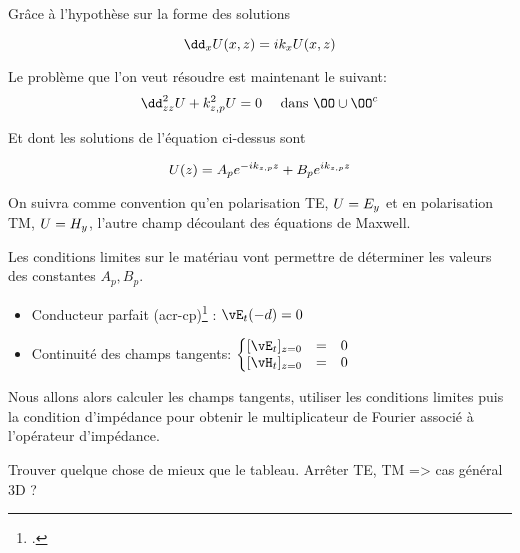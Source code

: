 


Grâce à l'hypothèse sur la forme des solutions

\[
\dd_{\x} U(\x,\z) = ik_\x U(\x,\z)
\]

Le problème que l'on veut résoudre est maintenant le suivant:
\begin{equation}
\dd_{\z\z}^2 U + k_{\z,p}^2 U = 0 \quad \text { dans \(\OO\cup\OO^c\)}
\end{equation}

Et dont les solutions de l'équation ci-dessus sont

\[
\hfill U(\z) = A_p e^{-ik_{\z,p} \z}  + B_p e^{ik_{\z,p} \z}
\]

On suivra comme convention qu'en polarisation TE, \( U = E_{y}\) et en polarisation TM, \( U = H_{y}\), l'autre champ découlant des équations de Maxwell.


Les conditions limites sur le matériau vont permettre de déterminer les valeurs des constantes \(A_p, B_p\).
\begin{itemize}
    \item 
    Conducteur parfait (\gls{acr-cp})\footcite[p.~217]{morse_methods_1953} : \(\vE_t(-d) = 0  \)
    \item 
    Continuité des champs tangents: \(
    \left\lbrace 
    \begin{matrix}
    [ \vE_t]_{\z=0} &=& 0 \\
    [ \vH_t]_{\z=0} &=& 0 
    \end{matrix}
    \right.\)
\end{itemize}

Nous allons alors calculer les champs tangents, utiliser les conditions limites puis la condition d'impédance pour obtenir le multiplicateur de Fourier associé à l'opérateur d'impédance.

\begin{TODO}
  Trouver quelque chose de mieux que le tableau. Arrêter TE, TM => cas général 3D ?
\end{TODO}

